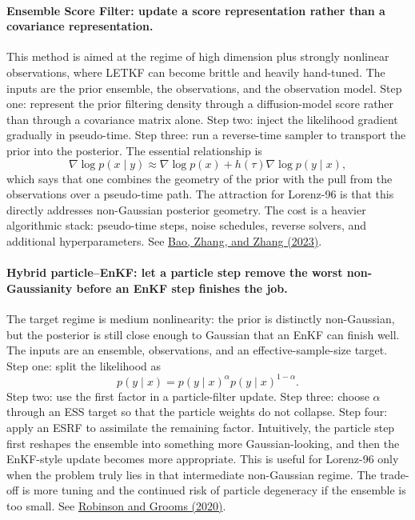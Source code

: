 \documentclass[12pt,a4paper]{article}
\begin{document}
\paragraph{Ensemble Score Filter: update a score representation rather than a covariance representation.}
This method is aimed at the regime of high dimension plus strongly nonlinear observations, where LETKF can become brittle and heavily hand-tuned. The inputs are the prior ensemble, the observations, and the observation model. Step one: represent the prior filtering density through a diffusion-model score rather than through a covariance matrix alone. Step two: inject the likelihood gradient gradually in pseudo-time. Step three: run a reverse-time sampler to transport the prior into the posterior. The essential relationship is
\[
\nabla \log p(x \mid y) \approx \nabla \log p(x) + h(\tau)\nabla \log p(y \mid x),
\]
which says that one combines the geometry of the prior with the pull from the observations over a pseudo-time path. The attraction for Lorenz-96 is that this directly addresses non-Gaussian posterior geometry. The cost is a heavier algorithmic stack: pseudo-time steps, noise schedules, reverse solvers, and additional hyperparameters. See \href{https://arxiv.org/abs/2309.00983}{Bao, Zhang, and Zhang (2023)}.

\paragraph{Hybrid particle--EnKF: let a particle step remove the worst non-Gaussianity before an EnKF step finishes the job.}
The target regime is medium nonlinearity: the prior is distinctly non-Gaussian, but the posterior is still close enough to Gaussian that an EnKF can finish well. The inputs are an ensemble, observations, and an effective-sample-size target. Step one: split the likelihood as
\[
p(y \mid x) = p(y \mid x)^{\alpha} p(y \mid x)^{1-\alpha}.
\]
Step two: use the first factor in a particle-filter update. Step three: choose \(\alpha\) through an ESS target so that the particle weights do not collapse. Step four: apply an ESRF to assimilate the remaining factor. Intuitively, the particle step first reshapes the ensemble into something more Gaussian-looking, and then the EnKF-style update becomes more appropriate. This is useful for Lorenz-96 only when the problem truly lies in that intermediate non-Gaussian regime. The trade-off is more tuning and the continued risk of particle degeneracy if the ensemble is too small. See \href{https://arxiv.org/abs/2006.04699}{Robinson and Grooms (2020)}.
\end{document}
